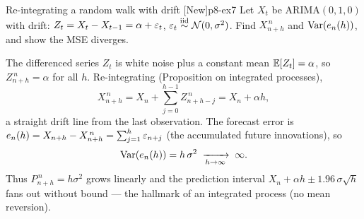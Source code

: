 \begin{exercise}{Re-integrating a random walk with drift \quad\textnormal{[New]}}{p8-ex7}
Let $X_t$ be ARIMA$(0,1,0)$ with drift: $Z_t=X_t-X_{t-1}=\alpha+\varepsilon_t$,
$\varepsilon_t\overset{\text{iid}}{\sim}\mathcal N(0,\sigma^2)$. Find $X^{\,n}_{n+h}$ and $\operatorname{Var}(e_n(h))$, and
show the MSE diverges.
\end{exercise}
\begin{solution}
The differenced series $Z_t$ is white noise plus a constant mean
$\mathbb{E}[Z_t]=\alpha$, so $Z^{\,n}_{n+h}=\alpha$ for all $h$. Re-integrating
(Proposition on integrated processes),
\[
X^{\,n}_{n+h}=X_n+\sum_{j=0}^{h-1}Z^{\,n}_{n+h-j}=X_n+\alpha h,
\]
a straight drift line from the last observation. The forecast error is
$e_n(h)=X_{n+h}-X^{\,n}_{n+h}=\sum_{j=1}^h\varepsilon_{n+j}$ (the accumulated future
innovations), so
\[
\operatorname{Var}(e_n(h))=h\,\sigma^2\;\xrightarrow[h\to\infty]{}\;\infty .
\]
Thus $P^{\,n}_{n+h}=h\sigma^2$ grows linearly and the prediction interval
$X_n+\alpha h\pm1.96\,\sigma\sqrt h$ fans out without bound --- the hallmark of an
integrated process (no mean reversion).
\end{solution}
